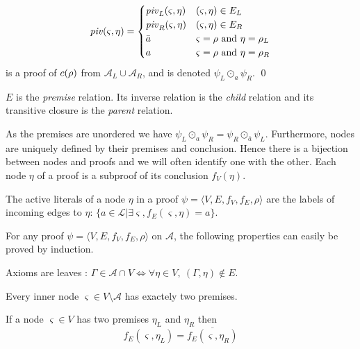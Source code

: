 \documentclass{llncs}
\newcommand{\dual}[1]{{\ensuremath{\bar{#1}}}}
\begin{document}
\begin{definition}[Proof]
\begin{enumerate}
    \begin{equation*}
      \pivot(\varsigma,\eta) = \begin{cases}
        \pivot_L(\varsigma,\eta) & (\varsigma,\eta) \in E_L \\
         \pivot_R(\varsigma,\eta) & (\varsigma,\eta) \in E_R \\
        \dual{a} & \varsigma = \rho \text{ and } \eta = \rho_L \\
        a        & \varsigma = \rho \text{ and } \eta = \rho_R
      \end{cases}
    \end{equation*}
    is a proof of $c(\rho)$ from $\mathcal{A}_L \cup \mathcal{A}_R$, and is denoted $\psi_L \odot_a \psi_R$.
  \qed
\end{enumerate}
\end{definition}

$E$ is the \emph{premise} relation. Its inverse relation is the \emph{child} relation and its
transitive closure is the \emph{parent} relation. 

As the premises are unordered we have $\psi_L \odot_a \psi_R = \psi_R \odot_\dual{a} \psi_L$.
Furthermore, nodes are uniquely defined by their premises and conclusion. Hence there is a bijection
between nodes and proofs and we will often identify one with the other. Each node $\eta$ of a proof
is a subproof of its conclusion $f_V(\eta)$.

\begin{definition}
The active literals of a node $\eta$ in a proof $\psi = \langle V,E,f_V,f_E,\rho \rangle$ are the
labels of incoming edges to $\eta$: $\{a \in \mathcal{L} | \exists \varsigma, f_E(\varsigma,\eta) =
a\}$.
\end{definition}

For any proof $\psi = \langle V,E,f_V,f_E,\rho \rangle$ on $\mathcal{A}$, the following properties
can easily be proved by induction.

\begin{property}
\label{prop:proof_leaf}
Axioms are leaves : $\Gamma \in \mathcal{A} \cap V \Leftrightarrow \forall \eta \in V ,~
(\Gamma,\eta) \notin E$.
\end{property}

\begin{property}
Every inner node $\varsigma \in V \setminus \mathcal{A}$ has exactely two premises.
\end{property}

\begin{property}
\label{prop:proof_edges}
If a node $\varsigma \in V$ has two premises $\eta_L$ and $\eta_R$ then
\begin{equation*}
f_E(\varsigma,\eta_L) = \overline{f_E(\varsigma,\eta_R)}
\end{equation*}
\end{property}
\end{document}
